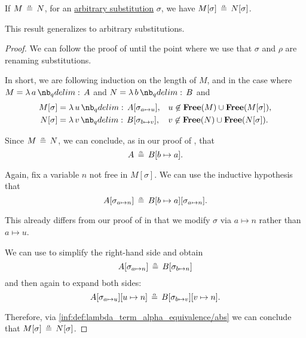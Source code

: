 \begin{proposition}\label{thm:substitution_on_alpha_equivalent_terms}
  If \( M \aequiv N \), for an \hyperref[def:lambda_substitution]{arbitrary substitution} \( \sigma \), we have \( M[\sigma] \aequiv N[\sigma] \).
\end{proposition}
\begin{comments}
  \item This result generalizes  to arbitrary substitutions.
\end{comments}
\begin{proof}
  We can follow the proof of  until the point where we use that \( \sigma \) and \( \rho \) are renaming substitutions.

  In short, we are following induction on the length of \( M \), and in the case where \( M = \qabs a A \) and \( N = \qabs b B \) and
  \begin{align*}
    M[\sigma] &= \qabs u A[\sigma_{a \mapsto u}], &&u \not\in \op*{Free}(M) \cup \op*{Free}(M[\sigma]), \\
    N[\sigma] &= \qabs v B[\sigma_{b \mapsto v}], &&v \not\in \op*{Free}(N) \cup \op*{Free}(N[\sigma]).
  \end{align*}

  Since \( M \aequiv N \), we can conclude, as in our proof of , that
  \begin{equation*}
    A \aequiv B[b \mapsto a].
  \end{equation*}

  Again, fix a variable \( n \) not free in \( M[\sigma] \). We can use the inductive hypothesis that
  \begin{equation*}
    A[\sigma_{a \mapsto n}] \aequiv B[b \mapsto a][\sigma_{a \mapsto n}].
  \end{equation*}

  This already differs from our proof of  in that we modify \( \sigma \) via \( a \mapsto n \) rather than \( a \mapsto u \).

  We can use  to simplify the right-hand side and obtain
  \begin{equation*}
    A[\sigma_{a \mapsto n}] \aequiv B[\sigma_{b \mapsto n}]
  \end{equation*}
  and then again to expand both sides:
  \begin{equation*}
    A[\sigma_{a \mapsto u}][u \mapsto n] \aequiv B[\sigma_{b \mapsto v}][v \mapsto n].
  \end{equation*}

  Therefore, via \ref{inf:def:lambda_term_alpha_equivalence/abs} we can conclude that \( M[\sigma] \aequiv N[\sigma] \).
\end{proof}

